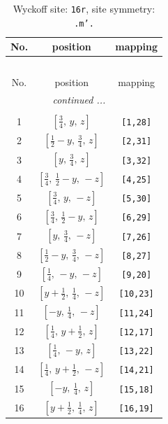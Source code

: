 \documentclass[fleqn,8pt]{jsarticle}
\begin{document}
\renewcommand{\arraystretch}{1.2}
\begin{longtable}{ccc}
\caption{Wyckoff site: {\tt 16r}, site symmetry: {\tt .m'.}}
 \\
 \hline \hline
No. & position & mapping \\ \hline \endfirsthead

\multicolumn{2}{l}{\tablename\ \thetable{}} \\
 \hline \hline
No. & position & mapping \\ \hline \endhead

 \hline \hline
\multicolumn{2}{r}{\footnotesize\it continued ...} \\ \endfoot

 \hline \hline
\multicolumn{2}{r}{} \\ \endlastfoot

1 & $\left[ \frac{3}{4},\, y,\, z \right]$ & {\tt [1,28]} \\ \hline
2 & $\left[ \frac{1}{2} - y,\, \frac{3}{4},\, z \right]$ & {\tt [2,31]} \\ \hline
3 & $\left[ y,\, \frac{3}{4},\, z \right]$ & {\tt [3,32]} \\ \hline
4 & $\left[ \frac{3}{4},\, \frac{1}{2} - y,\, - z \right]$ & {\tt [4,25]} \\ \hline
5 & $\left[ \frac{3}{4},\, y,\, - z \right]$ & {\tt [5,30]} \\ \hline
6 & $\left[ \frac{3}{4},\, \frac{1}{2} - y,\, z \right]$ & {\tt [6,29]} \\ \hline
7 & $\left[ y,\, \frac{3}{4},\, - z \right]$ & {\tt [7,26]} \\ \hline
8 & $\left[ \frac{1}{2} - y,\, \frac{3}{4},\, - z \right]$ & {\tt [8,27]} \\ \hline
9 & $\left[ \frac{1}{4},\, - y,\, - z \right]$ & {\tt [9,20]} \\ \hline
10 & $\left[ y + \frac{1}{2},\, \frac{1}{4},\, - z \right]$ & {\tt [10,23]} \\ \hline
11 & $\left[ - y,\, \frac{1}{4},\, - z \right]$ & {\tt [11,24]} \\ \hline
12 & $\left[ \frac{1}{4},\, y + \frac{1}{2},\, z \right]$ & {\tt [12,17]} \\ \hline
13 & $\left[ \frac{1}{4},\, - y,\, z \right]$ & {\tt [13,22]} \\ \hline
14 & $\left[ \frac{1}{4},\, y + \frac{1}{2},\, - z \right]$ & {\tt [14,21]} \\ \hline
15 & $\left[ - y,\, \frac{1}{4},\, z \right]$ & {\tt [15,18]} \\ \hline
16 & $\left[ y + \frac{1}{2},\, \frac{1}{4},\, z \right]$ & {\tt [16,19]} \\
\end{longtable}
\end{document}
